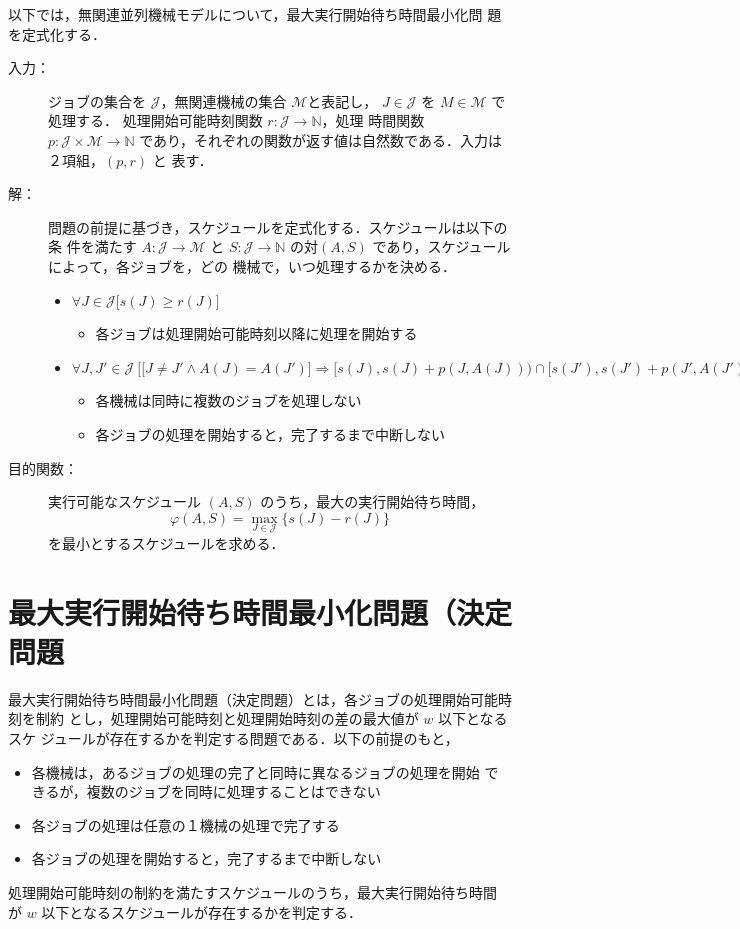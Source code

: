 \documentclass[12pt]{optlab-bachelor}
\begin{document}
以下では，無関連並列機械モデルについて，最大実行開始待ち時間最小化問
題を定式化する．
\begin{description}
  \item[入力：] ジョブの集合を $\mathcal{J}$，無関連機械の集合 $\mathcal{M}$と表記し，
  $J \in \mathcal{J}$ を $M \in \mathcal{M}$ で処理する．
  処理開始可能時刻関数 $r : \mathcal{J} \to \mathbb{N}$，処理
  時間関数 $p : \mathcal{J} \times \mathcal{M} \to \mathbb{N}$
  であり，それぞれの関数が返す値は自然数である．入力は２項組，$(p,r)$ と
  表す．
  \item[解：] 問題の前提に基づき，スケジュールを定式化する．スケジュールは以下の条
  件を満たす $A : \mathcal{J} \to \mathcal{M}$ と $S : \mathcal{J} \to
  \mathbb{N}$ の対$(A,S)$ であり，スケジュールによって，各ジョブを，どの
  機械で，いつ処理するかを決める．
  \begin{itemize}
    \item $\forall J \in \mathcal{J}\big[s(J) \ge r(J) \big]$
    \begin{itemize}
      \item 各ジョブは処理開始可能時刻以降に処理を開始する
    \end{itemize}
    \item $\forall J, J' \in \mathcal{J}\ \Big[ \big[J\neq J' \land A(J) = A(J')\big] \Rightarrow [s(J), s(J)+p(J,A(J))) \cap[s(J'), s(J')+p(J', A(J'))) = \emptyset \Big]$
    \begin{itemize}
      \item 各機械は同時に複数のジョブを処理しない
      \item 各ジョブの処理を開始すると，完了するまで中断しない
    \end{itemize}
  \end{itemize}
  \item[目的関数：] 実行可能なスケジュール $(A,S)$ のうち，最大の実行開始待ち時間，
  $$\varphi(A,S) = \displaystyle \max_{J \in \mathcal{J}}\{s(J) -
  r(J)\}$$
  を最小とするスケジュールを求める．
\end{description}

\section{最大実行開始待ち時間最小化問題（決定問題}
最大実行開始待ち時間最小化問題（決定問題）とは，各ジョブの処理開始可能時刻を制約
とし，処理開始可能時刻と処理開始時刻の差の最大値が $w$ 以下となるスケ
ジュールが存在するかを判定する問題である．以下の前提のもと，
\begin{itemize}
  \item 各機械は，あるジョブの処理の完了と同時に異なるジョブの処理を開始
  できるが，複数のジョブを同時に処理することはできない
  \item 各ジョブの処理は任意の１機械の処理で完了する
  \item 各ジョブの処理を開始すると，完了するまで中断しない
\end{itemize}
処理開始可能時刻の制約を満たすスケジュールのうち，最大実行開始待ち時間
が $w$ 以下となるスケジュールが存在するかを判定する．
\end{document}
